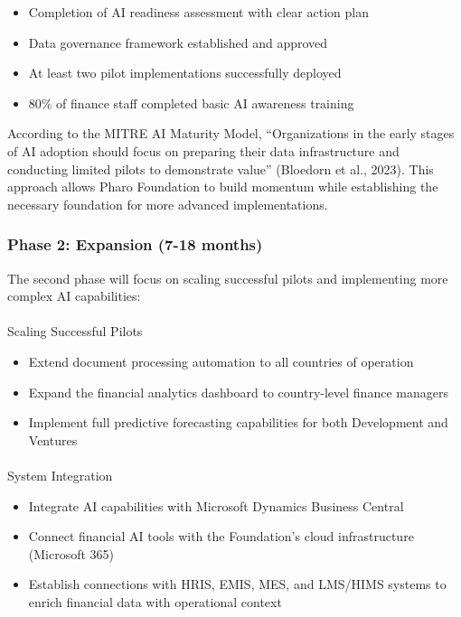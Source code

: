 \documentclass[
]{article}
\makeatletter
\let\oldparagraph\paragraph
\renewcommand{\paragraph}{
    \@ifstar
      \xxxParagraphStar
      \xxxParagraphNoStar
  }
\newcommand{\xxxParagraphStar}[1]{\oldparagraph*{#1}\mbox{}}
\newcommand{\xxxParagraphNoStar}[1]{\oldparagraph{#1}\mbox{}}
\providecommand{\tightlist}{%
  \setlength{\itemsep}{0pt}\setlength{\parskip}{0pt}}\usepackage{longtable,booktabs,array}
\makeatother
\begin{document}
\begin{itemize}
\tightlist
\item
  Completion of AI readiness assessment with clear action plan
\item
  Data governance framework established and approved
\item
  At least two pilot implementations successfully deployed
\item
  80\% of finance staff completed basic AI awareness training
\end{itemize}

According to the MITRE AI Maturity Model, ``Organizations in the early
stages of AI adoption should focus on preparing their data
infrastructure and conducting limited pilots to demonstrate value''
(Bloedorn et al., 2023). This approach allows Pharo Foundation to build
momentum while establishing the necessary foundation for more advanced
implementations.

\subsubsection{Phase 2: Expansion (7-18
months)}\label{phase-2-expansion-7-18-months}

The second phase will focus on scaling successful pilots and
implementing more complex AI capabilities:

\paragraph{Scaling Successful Pilots}\label{scaling-successful-pilots}

\begin{itemize}
\tightlist
\item
  Extend document processing automation to all countries of operation
\item
  Expand the financial analytics dashboard to country-level finance
  managers
\item
  Implement full predictive forecasting capabilities for both
  Development and Ventures
\end{itemize}

\paragraph{System Integration}\label{system-integration}

\begin{itemize}
\tightlist
\item
  Integrate AI capabilities with Microsoft Dynamics Business Central
\item
  Connect financial AI tools with the Foundation's cloud infrastructure
  (Microsoft 365)
\item
  Establish connections with HRIS, EMIS, MES, and LMS/HIMS systems to
  enrich financial data with operational context
\end{itemize}
\end{document}
